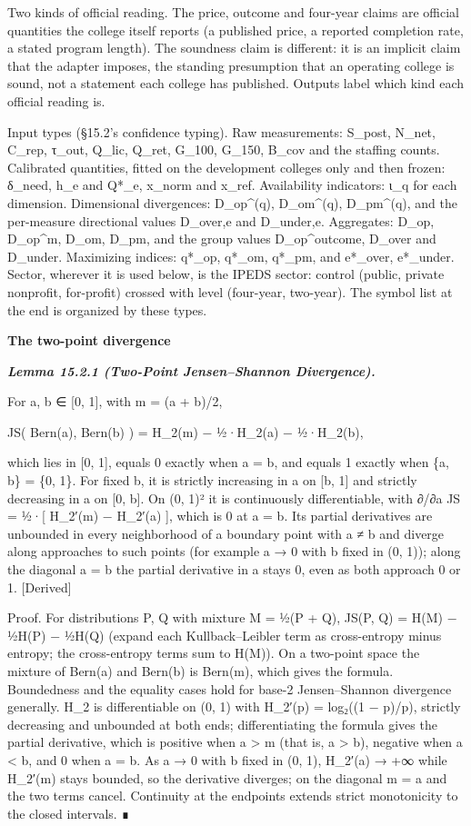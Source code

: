 \documentclass[
]{article}
\begin{document}
Two kinds of official reading. The price, outcome and four-year claims
are official quantities the college itself reports (a published price, a
reported completion rate, a stated program length). The soundness claim
is different: it is an implicit claim that the adapter imposes, the
standing presumption that an operating college is sound, not a statement
each college has published. Outputs label which kind each official
reading is.

Input types (§15.2's confidence typing). Raw measurements: S\_post,
N\_net, C\_rep, τ\_out, Q\_lic, Q\_ret, G\_100, G\_150, B\_cov and the
staffing counts. Calibrated quantities, fitted on the development
colleges only and then frozen: δ\_need, h\_e and Q*\_e, x\_norm and
x\_ref. Availability indicators: ι\_q for each dimension. Dimensional
divergences: D\_op\^{}(q), D\_om\^{}(q), D\_pm\^{}(q), and the
per-measure directional values D\_over,e and D\_under,e. Aggregates:
D\_op, D\_op\^{}m, D\_om, D\_pm, and the group values D\_op\^{}outcome,
D\_over and D\_under. Maximizing indices: q*\_op, q*\_om, q*\_pm, and
e*\_over, e*\_under. Sector, wherever it is used below, is the IPEDS
sector: control (public, private nonprofit, for-profit) crossed with
level (four-year, two-year). The symbol list at the end is organized by
these types.

\textbf{The two-point divergence}

\emph{\textbf{Lemma 15.2.1 (Two-Point Jensen--Shannon Divergence).}}

For a, b ∈ {[}0, 1{]}, with m = (a + b)/2,

JS( Bern(a), Bern(b) ) = H\_2(m) − ½·H\_2(a) − ½·H\_2(b),

which lies in {[}0, 1{]}, equals 0 exactly when a = b, and equals 1
exactly when \{a, b\} = \{0, 1\}. For fixed b, it is strictly increasing
in a on {[}b, 1{]} and strictly decreasing in a on {[}0, b{]}. On (0,
1)² it is continuously differentiable, with ∂/∂a JS = ½·{[} H\_2′(m) −
H\_2′(a) {]}, which is 0 at a = b. Its partial derivatives are unbounded
in every neighborhood of a boundary point with a ≠ b and diverge along
approaches to such points (for example a → 0 with b fixed in (0, 1));
along the diagonal a = b the partial derivative in a stays 0, even as
both approach 0 or 1. {[}Derived{]}

Proof. For distributions P, Q with mixture M = ½(P + Q), JS(P, Q) = H(M)
− ½H(P) − ½H(Q) (expand each Kullback--Leibler term as cross-entropy
minus entropy; the cross-entropy terms sum to H(M)). On a two-point
space the mixture of Bern(a) and Bern(b) is Bern(m), which gives the
formula. Boundedness and the equality cases hold for base-2
Jensen--Shannon divergence generally. H\_2 is differentiable on (0, 1)
with H\_2′(p) = log₂((1 − p)/p), strictly decreasing and unbounded at
both ends; differentiating the formula gives the partial derivative,
which is positive when a \textgreater{} m (that is, a \textgreater{} b),
negative when a \textless{} b, and 0 when a = b. As a → 0 with b fixed
in (0, 1), H\_2′(a) → +∞ while H\_2′(m) stays bounded, so the derivative
diverges; on the diagonal m = a and the two terms cancel. Continuity at
the endpoints extends strict monotonicity to the closed intervals. ∎
\end{document}
